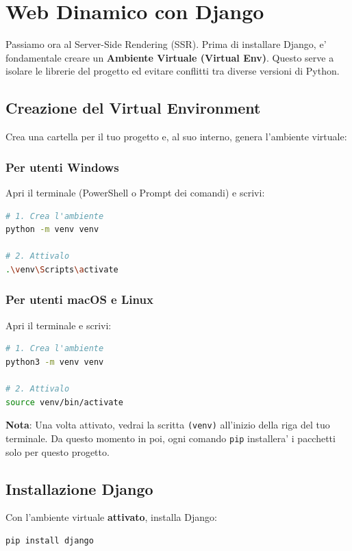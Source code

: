 \documentclass[11pt,a4paper]{report}
\begin{document}
\chapter{Web Dinamico con Django}

Passiamo ora al Server-Side Rendering (SSR). Prima di installare Django, e' fondamentale creare un \textbf{Ambiente Virtuale (Virtual Env)}. Questo serve a isolare le librerie del progetto ed evitare conflitti tra diverse versioni di Python.

\section{Creazione del Virtual Environment}
Crea una cartella per il tuo progetto e, al suo interno, genera l'ambiente virtuale:

\subsection{Per utenti Windows}
Apri il terminale (PowerShell o Prompt dei comandi) e scrivi:
\begin{lstlisting}[language=bash]
# 1. Crea l'ambiente
python -m venv venv

# 2. Attivalo
.\venv\Scripts\activate
\end{lstlisting}

\subsection{Per utenti macOS e Linux}
Apri il terminale e scrivi:
\begin{lstlisting}[language=bash]
# 1. Crea l'ambiente
python3 -m venv venv

# 2. Attivalo
source venv/bin/activate
\end{lstlisting}

\textbf{Nota}: Una volta attivato, vedrai la scritta \texttt{(venv)} all'inizio della riga del tuo terminale. Da questo momento in poi, ogni comando \texttt{pip} installera' i pacchetti solo per questo progetto.

\section{Installazione Django}
Con l'ambiente virtuale \textbf{attivato}, installa Django:
\begin{lstlisting}[language=bash]
pip install django
\end{lstlisting}
\end{document}
